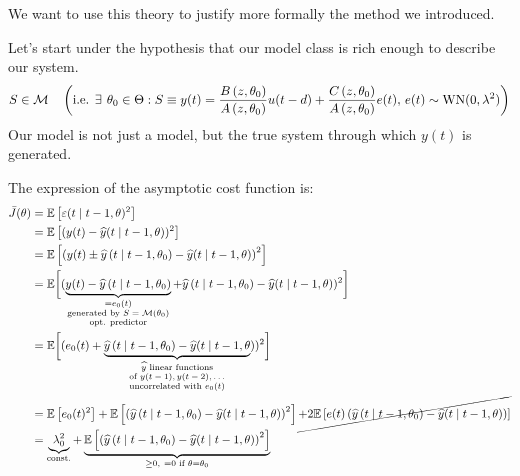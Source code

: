 We want to use this theory to justify more formally the method we introduced.

Let's start under the hypothesis that our model class is rich enough to describe our system.
\begin{equation*}
S\in \Mc \quad \left(\text{i.e. }\exists\,\theta _{0} \in \Theta :S\equiv y(t) =\frac{B\left(z,\theta _{0}\right)}{A\left(z,\theta _{0}\right)} u(t-d) +\frac{C\left(z,\theta _{0}\right)}{A\left(z,\theta _{0}\right)} e(t),\, e(t) \sim \WN(0,\lambda ^{2})\right)
\end{equation*}
Our model is not just a model, but the true system through which $ y(t)$ is generated.

The expression of the asymptotic cost function is:
\begin{align*}
	\bar{J}(\theta) & =\mathbb{E}\left[ \varepsilon (t\mid t-1,\theta)^{2}\right] \\
	& = \mathbb{E}\left[(y(t) -\widehat{y}(t\mid t-1,\theta))^{2}\right] \\
	& = \mathbb{E}\left[\left(y(t) \pm \widehat{y}\left(t\mid t-1,\theta _{0}\right) -\widehat{y}(t\mid t-1,\theta)\right)^{2}\right] \\
	& = \mathbb{E}\bigg[(\underbrace{
			y(t) -\widehat{y}\left(t\mid t-1,\theta_{0}\right)
		}_{
			\substack{=e_{0}(t) \\ \text{generated by $S=\mathcal{M}(\theta_{0})$} \\ \text{opt. predictor}}
		}
		+ \widehat{y}\left(t\mid t-1,\theta _{0}\right) -\widehat{y}(t\mid t-1,\theta))^{2}\bigg] \\
	& = \mathbb{E}\bigg[(e_{0}(t) + \underbrace{
			\widehat{y}\left(t\mid t-1,\theta _{0}\right) -\widehat{y}(t\mid t-1,\theta
		}_{
			\substack{\text{$\widehat{y}$ linear functions} \\ \text{of $y(t-1),y(t-2),\ldots$} \\ \text{uncorrelated with $e_{0}(t)$}}
		}
		))^{2}\bigg] \\
	& = \mathbb{E}\left[ e_{0}(t)^{2}\right] +\mathbb{E}\left[\left(\widehat{y}\left(t\mid t-1,\theta _{0}\right) -\widehat{y}(t\mid t-1,\theta)\right)^{2}\right] \cancel{+2\mathbb{E}\left[e(t)\left(\widehat{y}\left(t\mid t-1,\theta _{0}\right) -\widehat{y}(t\mid t-1,\theta)\right)\right]} \\
	& = \underbrace{\lambda _{0}^{2}}_{\text{const.}} +\underbrace{\mathbb{E}\left[\left(\widehat{y}\left(t\mid t-1,\theta _{0}\right) -\widehat{y}(t\mid t-1,\theta)\right)^{2}\right]}_{\geq 0,\ =0\text{ if } \theta =\theta _{0}}
\end{align*}

